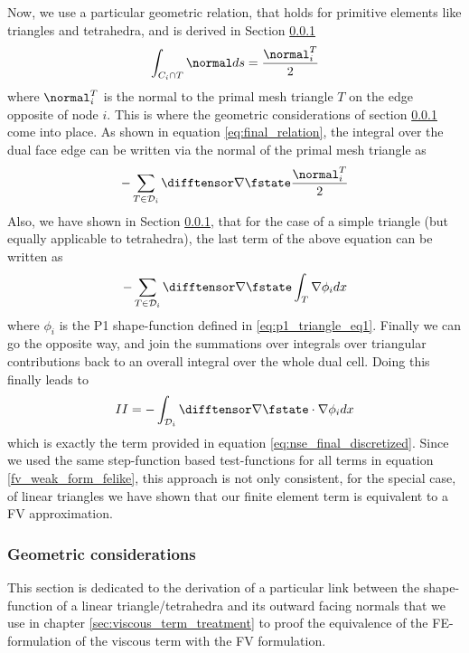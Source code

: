 \documentclass[../main.tex]{subfiles}
\begin{document}
Now, we use a particular geometric relation, that holds for primitive elements like triangles and tetrahedra, and is  derived in Section \ref{sec:geometric_considerations}
\begin{align}
  \int_{C_i\cap T} \normal ds = \frac{\normal_i^T}{2}
\end{align}
where $\normal_i^T$ is the normal to the primal mesh triangle $T$ on the edge opposite of node $i$.
This is where the geometric considerations of section \ref{sec:geometric_considerations} come into place. As shown in equation \eqref{eq:final_relation}, the integral over the dual face edge can be written via the normal of the primal mesh triangle as
\begin{align}
  -\sum_{T\in\mathcal{D}_i} \difftensor \nabla\fstate \frac{\normal_i^T}{2}
\end{align}
Also, we have shown in Section \ref{sec:geometric_considerations}, that for the case of a simple triangle (but equally applicable to tetrahedra), the last term of the above equation can be written as
\begin{align}
  -\sum_{T\in\mathcal{D}_i} \difftensor \nabla\fstate \int_T \nabla \phi_i dx
\end{align}
where $\phi_i$ is the P1 shape-function defined in \eqref{eq:p1_triangle_eq1}.
Finally we can go the opposite way, and join the summations over integrals over triangular contributions back to an overall integral over the whole dual cell. Doing this finally leads to
\begin{align}
  II = -\int_{\mathcal{D}_i} \difftensor \nabla\fstate\cdot\nabla \phi_i dx
\end{align}
which is exactly the term provided in equation \eqref{eq:nse_final_discretized}.
Since we used the same step-function based test-functions for all terms in equation \eqref{fv_weak_form_felike}, this approach is not only consistent, for the special case, of linear triangles we have shown that our finite element term is equivalent to a FV approximation.



\subsubsection{Geometric considerations}\label{sec:geometric_considerations}
This section is dedicated to the derivation of a particular link between the shape-function of a linear triangle/tetrahedra and its outward facing normals that we use in chapter \ref{sec:viscous_term_treatment} to proof the equivalence of the \ac{FE}-formulation of the viscous term with the \ac{FV} formulation.
\end{document}
